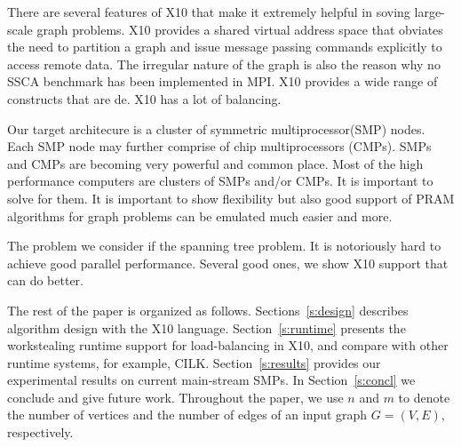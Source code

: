  There are several features of X10 that make it extremely helpful in soving large-scale graph problems. X10 provides a shared virtual address space that obviates the need to partition a graph and issue message passing commands explicitly to access remote data. The irregular nature of the graph is also the reason why no SSCA benchmark has been implemented in MPI. X10 provides a wide range of constructs that are de. X10 has a lot of balancing.

 Our target architecure is a cluster of symmetric multiprocessor(SMP) nodes. Each SMP node may further comprise of chip multiprocessors (CMPs).  SMPs and CMPs are becoming very powerful and common place. Most of the high performance
computers are clusters of SMPs and/or CMPs. It is important to solve for them.
It is important to show flexibility but also good support of  PRAM algorithms for graph problems can be emulated much easier and more. 

The problem we consider if the spanning tree problem. It is notoriously hard to achieve good parallel performance.  Several good ones, we show X10 support that can do better. 

 The rest of the paper is organized as follows. Sections~\ref{s:design} describes algorithm design with the X10 language.
 Section~\ref{s:runtime} presents the workstealing runtime support for load-balancing in X10, and compare with other runtime systems, for example, CILK. 
 Section~\ref{s:results} provides our experimental results on current main-stream SMPs.
 In Section~\ref{s:concl} we conclude and give future work. 
 Throughout the paper, we
 use $n$ and $m$ to denote the number of vertices and the number of
 edges of an input graph $G=(V,E)$, respectively. 
  


